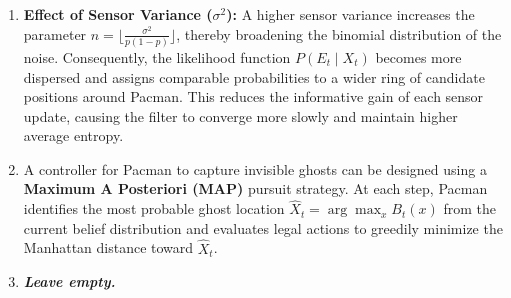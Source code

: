 \documentclass{article}
\begin{document}
\begin{enumerate}[label=\alph*.,leftmargin=*]
    \item 
    \textbf{Effect of Sensor Variance ($\sigma^2$):}
    A higher sensor variance increases the parameter $n = \lfloor \frac{\sigma^2}{p(1-p)} \rfloor$, thereby broadening the binomial distribution of the noise. Consequently, the likelihood function $P(E_t \mid X_t)$ becomes more dispersed and assigns comparable probabilities to a wider ring of candidate positions around Pacman. This reduces the informative gain of each sensor update, causing the filter to converge more slowly and maintain higher average entropy.

    \item 
    A controller for Pacman to capture invisible ghosts can be designed using a \textbf{Maximum A Posteriori (MAP)} pursuit strategy. At each step, Pacman identifies the most probable ghost location $\hat{X}_t = \arg\max_{x} B_t(x)$ from the current belief distribution and evaluates legal actions to greedily minimize the Manhattan distance toward $\hat{X}_t$.

    \item \textbf{\textit{Leave empty.}}
\end{enumerate}

\end{document}
